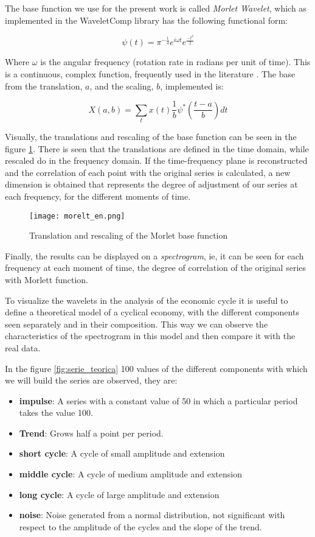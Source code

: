 \documentclass[a4paper]{article}
\begin{document}
The base function we use for the present work is called \textit{Morlet Wavelet}, which as implemented in the WaveletComp \citep{Roesch2018} library has the following functional form:

$$
\psi(t)=\pi^{-\frac{1}{4}}e^{i\omega t}e^{\frac{-t^2}{2}}
$$


Where $\omega$ is the angular frequency (rotation rate in radians per unit of time). This is a continuous, complex function, frequently used in the literature \citep{conraria2011continuous}. The base from the translation, $a$, and the scaling, $b$, implemented is:

$$
X(a,b)=\sum_{t} x(t)   \frac{1}{b} \psi^*\left(\frac{t-a}{b}\right)dt
$$

Visually, the translations and rescaling of the base function can be seen in the figure \ref{fig:morlet}. There is seen that the translations are defined in the time domain, while rescaled do in the frequency domain. If the time-frequency plane is reconstructed and the correlation of each point with the original series is calculated, a new dimension is obtained that represents the degree of adjustment of our series at each frequency, for the different moments of time.

\begin{figure}[H]
	\centering
	\texttt{[image: morelt\_en.png]}
	\caption{Translation and rescaling of the Morlet base function} \label{fig:morlet}
\end{figure}

Finally, the results can be displayed on a \textit{spectrogram}, ie, it can be seen for each frequency at each moment of time, the degree of correlation of the original series with Morlett function.


To visualize the wavelets in the analysis of the economic cycle it is useful to define a theoretical model of a cyclical economy, with the different components seen separately and in their composition. This way we can observe the characteristics of the spectrogram in this model and then compare it with the real data.

In the figure \ref{fig:serie_teorica} 100 values of the different components with which we will build the series are observed, they are:


\begin{itemize}
	
	\item \textbf{impulse}: A series with a constant value of 50 in which a particular period takes the value 100.
	\item \textbf{Trend}: Grows half a point per period.
	\item \textbf{short cycle}: A cycle of small amplitude and extension
	\item \textbf{middle cycle}: A cycle of medium amplitude and extension
	\item \textbf{long cycle}: A cycle of large amplitude and extension
	\item \textbf{noise}: Noise generated from a normal distribution, not significant with respect to the amplitude of the cycles and the slope of the trend.
\end{itemize}
\end{document}
